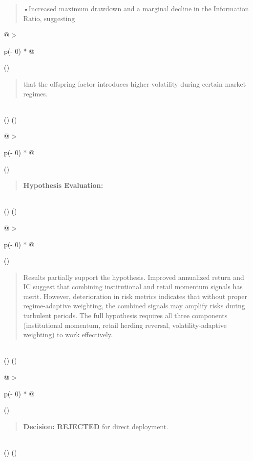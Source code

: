 \documentclass[
]{article}
\begin{document}
\begin{quote}
•Increased maximum drawdown and a marginal decline in the Information
Ratio, suggesting
\end{quote}

\begin{longtable}[]{@{}
  >{\raggedright\arraybackslash}p{(\columnwidth - 0\tabcolsep) * }@{}}
\toprule()
\begin{minipage}[b]{\linewidth}\raggedright
\begin{quote}
that the offspring factor introduces higher volatility during certain
market regimes.
\end{quote}
\end{minipage} \\
\midrule()
\endhead
\bottomrule()
\end{longtable}

\begin{longtable}[]{@{}
  >{\raggedright\arraybackslash}p{(\columnwidth - 0\tabcolsep) * }@{}}
\toprule()
\begin{minipage}[b]{\linewidth}\raggedright
\begin{quote}
\textbf{Hypothesis Evaluation:}
\end{quote}
\end{minipage} \\
\midrule()
\endhead
\bottomrule()
\end{longtable}

\begin{longtable}[]{@{}
  >{\raggedright\arraybackslash}p{(\columnwidth - 0\tabcolsep) * }@{}}
\toprule()
\begin{minipage}[b]{\linewidth}\raggedright
\begin{quote}
Results partially support the hypothesis. Improved annualized return and
IC suggest that combining institutional and retail momentum signals has
merit. However, deterioration in risk metrics indicates that without
proper regime-adaptive weighting, the combined signals may amplify risks
during turbulent periods. The full hypothesis requires all three
components (institutional momentum, retail herding reversal,
volatility-adaptive weighting) to work effectively.
\end{quote}
\end{minipage} \\
\midrule()
\endhead
\bottomrule()
\end{longtable}

\begin{longtable}[]{@{}
  >{\raggedright\arraybackslash}p{(\columnwidth - 0\tabcolsep) * }@{}}
\toprule()
\begin{minipage}[b]{\linewidth}\raggedright
\begin{quote}
\textbf{Decision: REJECTED} for direct deployment.
\end{quote}
\end{minipage} \\
\midrule()
\endhead
\bottomrule()
\end{longtable}
\end{document}
